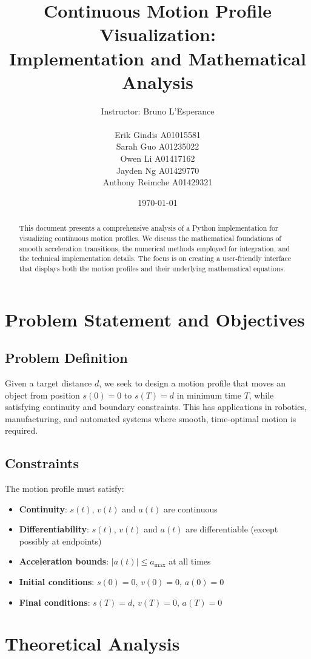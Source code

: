 \documentclass[12pt,a4paper]{article}
\title{Continuous Motion Profile Visualization:\\Implementation and Mathematical Analysis}
\author{Instructor: Bruno L'Esperance\\\\
    Erik Gindis A01015581 \\
    Sarah Guo A01235022 \\
    Owen Li A01417162 \\
    Jayden Ng A01429770 \\
    Anthony Reimche A01429321}
\date{\today}
\begin{document}
\maketitle

\begin{abstract}
This document presents a comprehensive analysis of a Python implementation for visualizing continuous motion profiles. We discuss the mathematical foundations of smooth acceleration transitions, the numerical methods employed for integration, and the technical implementation details. The focus is on creating a user-friendly interface that displays both the motion profiles and their underlying mathematical equations.
\end{abstract}

\tableofcontents

\section{Problem Statement and Objectives}

\subsection{Problem Definition}
Given a target distance $d$, we seek to design a motion profile that moves an object from position $s(0)=0$ to $s(T)=d$ in minimum time $T$, while satisfying continuity and boundary constraints. This has applications in robotics, manufacturing, and automated systems where smooth, time-optimal motion is required.

\subsection{Constraints}
The motion profile must satisfy:
\begin{itemize}
\item \textbf{Continuity}: $s(t)$, $v(t)$ and $a(t)$ are continuous
\item \textbf{Differentiability}: $s(t)$, $v(t)$ and $a(t)$ are differentiable (except possibly at endpoints)
\item \textbf{Acceleration bounds}: $|a(t)| \leq a_{\text{max}}$ at all times
\item \textbf{Initial conditions}: $s(0) = 0$, $v(0) = 0$, $a(0) = 0$
\item \textbf{Final conditions}: $s(T) = d$, $v(T) = 0$, $a(T) = 0$
\end{itemize}

\section{Theoretical Analysis}
\end{document}
